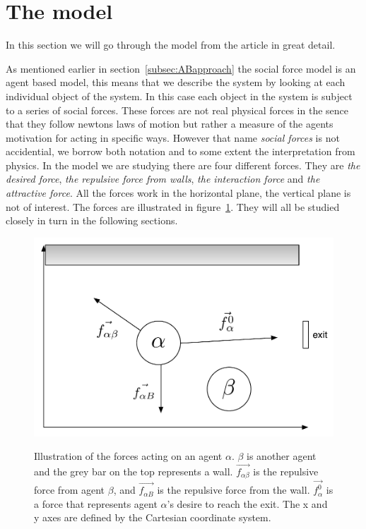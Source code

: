 \section{The model}
\label{sec:the-model}
In this section we will go through the model from the article \cite{self-org} 
in great detail. 
 
As mentioned earlier in section~\ref{subsec:ABapproach} the social force model 
is an agent based model, this means that we describe the system by looking at 
each individual object of the system. In this case each object in the system 
is subject to a series of social forces. These forces are not real physical 
forces in the sence that they follow newtons laws of motion but rather a 
measure of the agents motivation for acting in specific ways. However that 
name \emph{social forces} is not accidential, we borrow both notation and to 
some extent the interpretation from physics. In the model we are studying 
there are four different forces. They are \emph{the desired force}, \emph{the 
repulsive force from walls}, \emph{the interaction force} and \emph{the 
attractive force}. All the forces work in the horizontal plane, the vertical 
plane is not of interest. The forces are illustrated in 
figure~\ref{ForceModel}.  They will all be studied closely in turn in the 
following sections.

\begin{figure}[hb]
    \centering
    {\includegraphics[scale=0.45]{Figures/ForceModel.pdf}} \caption[Notation 
    of forces acting on an agent]{Illustration of the forces acting on an 
    agent $\alpha $. $ \beta $ is another agent and the grey bar on the top 
    represents a wall. $ \vec{f_{\alpha\beta}} $ is the repulsive force from 
    agent $ \beta $, and $ \vec{f_{\alpha B}} $ is the repulsive force from 
    the wall. $ \vec{f^{0}_{\alpha}} $ is a force that represents agent $ 
    \alpha $'s desire to reach the exit.  The x and y axes are defined by the 
    Cartesian coordinate system.}
    \label{ForceModel}
\end{figure}

